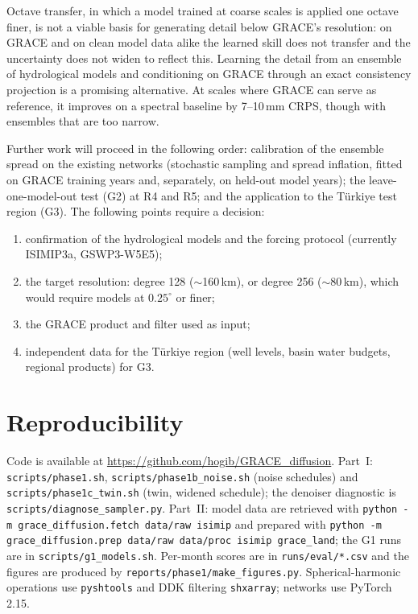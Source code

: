 \documentclass[11pt,a4paper]{article}
\newcommand{\code}[1]{\texttt{#1}}
\begin{document}
Octave transfer, in which a model trained at coarse scales is applied one octave finer, is not
a viable basis for generating detail below GRACE's resolution: on GRACE and on clean model data
alike the learned skill does not transfer and the uncertainty does not widen to reflect this.
Learning the detail from an ensemble of hydrological models and conditioning on GRACE through an
exact consistency projection is a promising alternative. At scales where GRACE can serve as
reference, it improves on a spectral baseline by 7--10\,mm CRPS, though with ensembles that are
too narrow.

Further work will proceed in the following order: calibration of the ensemble spread on the
existing networks (stochastic sampling and spread inflation, fitted on GRACE training years and,
separately, on held-out model years); the leave-one-model-out test (G2) at R4 and R5; and the
application to the Türkiye test region (G3). The following points require a decision:
\begin{enumerate}
  \item confirmation of the hydrological models and the forcing protocol (currently ISIMIP3a,
    GSWP3-W5E5);
  \item the target resolution: degree 128 ($\sim$160\,km), or degree 256 ($\sim$80\,km), which
    would require models at $0.25^\circ$ or finer;
  \item the GRACE product and filter used as input;
  \item independent data for the Türkiye region (well levels, basin water budgets, regional
    products) for G3.
\end{enumerate}

\appendix
\section{Reproducibility}
Code is available at \url{https://github.com/hogib/GRACE_diffusion}. Part~I:
\code{scripts/phase1.sh}, \code{scripts/phase1b\_noise.sh} (noise schedules) and
\code{scripts/phase1c\_twin.sh} (twin, widened schedule); the denoiser diagnostic is
\code{scripts/diagnose\_sampler.py}. Part~II: model data are retrieved with
\code{python -m grace\_diffusion.fetch data/raw isimip} and prepared with
\code{python -m grace\_diffusion.prep data/raw data/proc isimip grace\_land}; the G1 runs are in
\code{scripts/g1\_models.sh}. Per-month scores are in \code{runs/eval/*.csv} and the figures
are produced by \code{reports/phase1/make\_figures.py}. Spherical-harmonic operations use
\code{pyshtools} and DDK filtering \code{shxarray}; networks use PyTorch 2.15.
\end{document}
